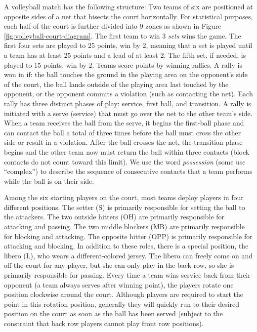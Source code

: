 \documentclass{article}
\begin{document}
A volleyball match has the following structure: Two teams of six are positioned at opposite sides of a net that bisects the court horizontally. For statistical purposes, each half of the court is further divided into 9 zones as shown in Figure \ref{fig:volleyball-court-diagram}. The first team to win 3 {\it sets} wins the game. The first four sets are played to 25 points, win by 2, meaning that a set is played until a team has at least 25 points and a lead of at least 2. The fifth set, if needed, is played to 15 points, win by 2. Teams score points by winning rallies. A rally is won in if: the ball touches the ground in the playing area on the opponent's side of the court, the ball lands outside of the playing area last touched by the opponent, or the opponent commits a violation (such as contacting the net). Each rally has three distinct phases of play: service, first ball, and transition. A rally is initiated with a serve (service) that must go over the net to the other team's side. When a team receives the ball from the serve, it begins the first-ball phase and can contact the ball a total of three times before the ball must cross the other side or result in a violation. After the ball crosses the net, the transition phase begins and the other team now must return the ball within three contacts (block contacts do not count toward this limit). We use the word {\it possession} (some use ``complex'') to describe the sequence of consecutive contacts that a team performs while the ball is on their side.

Among the six starting players on the court, most teams deploy players in four different positions. The setter (S) is primarily responsible for setting the ball to the attackers. The two outside hitters (OH) are primarily responsible for attacking and passing. The two middle blockers (MB) are primarily responsible for blocking and attacking. The opposite hitter (OPP) is primarily responsible for attacking and blocking. In addition to these roles, there is a special position, the libero (L), who wears a different-colored jersey. The libero can freely come on and off the court for any player, but she can only play in the back row, so she is primarily responsible for passing. Every time a team wins service back from their opponent (a team always serves after winning point), the players rotate one position clockwise around the court. Although players are required to start the point in this rotation position, generally they will quickly run to their desired position on the court as soon as the ball has been served (subject to the constraint that back row players cannot play front row positions).
\end{document}
